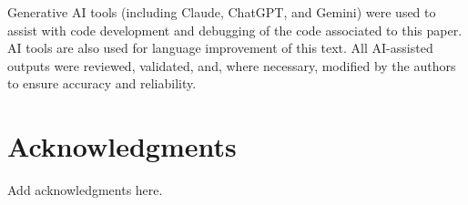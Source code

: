 \documentclass[12pt]{article}
\begin{document}
Generative AI tools (including Claude, ChatGPT, and Gemini) were used to assist
with code development and debugging of the code associated to this paper.
AI tools are also used for language improvement of this text.
All AI-assisted outputs were reviewed, validated, and, where necessary,
modified by the authors to ensure accuracy and reliability.

\section*{Acknowledgments}

Add acknowledgments here.


%
\end{document}
